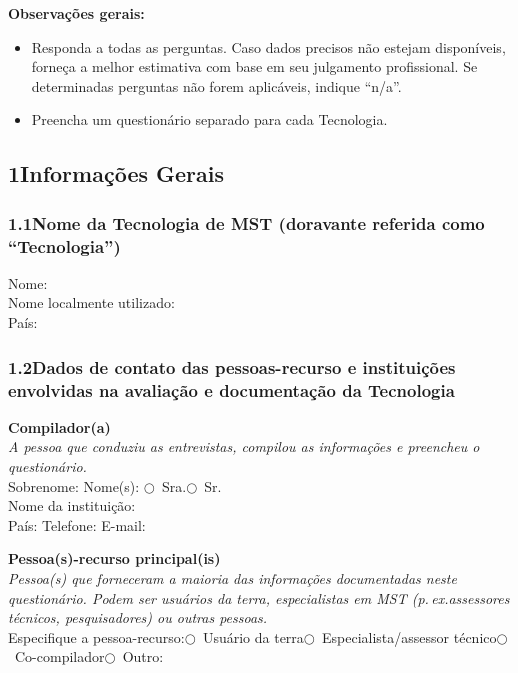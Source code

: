 \medskip\noindent
\textbf{Observações gerais:}
\begin{itemize}[nosep]
  \item Responda a todas as perguntas. Caso dados precisos não estejam disponíveis, forneça a melhor estimativa com base em seu julgamento profissional. Se determinadas perguntas não forem aplicáveis, indique ``n/a''.
  \item Preencha um questionário separado para cada Tecnologia.
\end{itemize}

\subsection*{1\quad Informações Gerais}

\subsubsection*{1.1\quad Nome da Tecnologia de MST (doravante referida como ``Tecnologia'')}

Nome: \dotfill\\
Nome localmente utilizado: \dotfill\\
País: \dotfill

\subsubsection*{1.2\quad Dados de contato das pessoas-recurso e instituições envolvidas na avaliação e documentação da Tecnologia}

\noindent\textbf{Compilador(a)}\\
\textit{A pessoa que conduziu as entrevistas, compilou as informações e preencheu o questionário.}\\[4pt]
Sobrenome: \dotfill\quad Nome(s): \dotfill\quad $\bigcirc$~Sra.\quad $\bigcirc$~Sr.\\
Nome da instituição: \dotfill\\
País: \dotfill\quad Telefone: \dotfill\quad E-mail: \dotfill

\medskip\noindent\textbf{Pessoa(s)-recurso principal(is)}\\
\textit{Pessoa(s) que forneceram a maioria das informações documentadas neste questionário. Podem ser usuários da terra, especialistas em MST (p.\,ex.\@ assessores técnicos, pesquisadores) ou outras pessoas.}\\[4pt]
Especifique a pessoa-recurso:\quad $\bigcirc$~Usuário da terra\quad $\bigcirc$~Especialista/assessor técnico\quad $\bigcirc$~Co-compilador\quad $\bigcirc$~Outro: \dotfill

